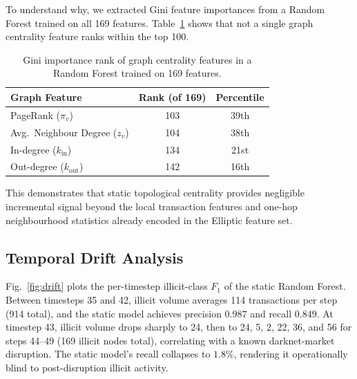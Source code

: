 \documentclass[conference]{IEEEtran}
\begin{document}
To understand why, we extracted Gini feature importances from a Random
Forest trained on all 169 features.
Table~\ref{tab:ranks} shows that not a single graph centrality feature
ranks within the top 100.

\begin{table}[t]
\centering
\caption{%
  Gini importance rank of graph centrality features in a Random Forest
  trained on 169 features.
}
\label{tab:ranks}
\renewcommand{\arraystretch}{1.2}
\begin{tabular}{@{}lcc@{}}
\toprule
\textbf{Graph Feature} & \textbf{Rank (of 169)} & \textbf{Percentile} \\
\midrule
PageRank ($\pi_v$)              & 103 & 39th \\
Avg.\ Neighbour Degree ($z_v$)  & 104 & 38th \\
In-degree ($k_{\text{in}}$)     & 134 & 21st \\
Out-degree ($k_{\text{out}}$)   & 142 & 16th \\
\bottomrule
\end{tabular}
\end{table}

This demonstrates that static topological centrality provides negligible
incremental signal beyond the local transaction features and one-hop
neighbourhood statistics already encoded in the Elliptic feature set.

\subsection{Temporal Drift Analysis}
\label{sec:results:drift}

Fig.~\ref{fig:drift} plots the per-timestep illicit-class $F_1$ of the
static Random Forest.
Between timesteps 35 and 42, illicit volume averages 114 transactions per
step (914 total), and the static model achieves precision $0.987$ and
recall $0.849$.
At timestep 43, illicit volume drops sharply to 24, then to 24, 5, 2, 22,
36, and 56 for steps 44--49 (169 illicit nodes total), correlating with
a known darknet-market disruption.
The static model's recall collapses to $1.8\%$, rendering it operationally
blind to post-disruption illicit activity.
\end{document}
